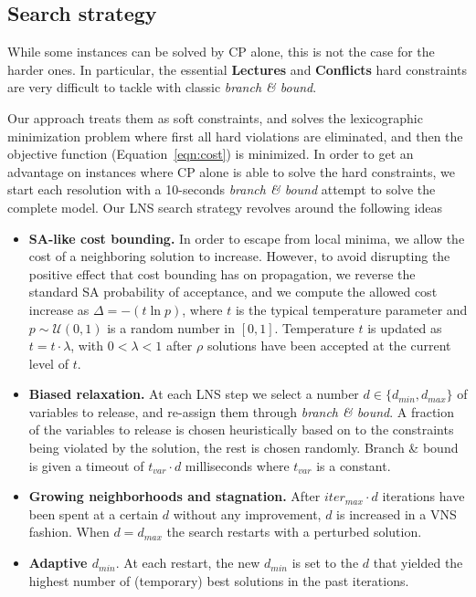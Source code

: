 \documentclass{llncs}
\begin{document}
\subsection{Search strategy}

While some instances can be solved by CP alone, this is not the case for the harder ones. In particular, the essential \textbf{Lectures} and \textbf{Conflicts} hard constraints are very difficult to tackle with classic \emph{branch \& bound}. 

Our approach treats them as soft constraints, and solves the lexicographic minimization problem where first all hard violations are eliminated, and then the objective function (Equation~\ref{eqn:cost}) is minimized. 
%
In order to get an advantage on instances where CP alone is able to solve the hard constraints, we start each resolution with a 10-seconds \emph{branch \& bound} attempt to solve the complete model.
%
\newpage
\noindent
Our LNS search strategy revolves around the following ideas

\begin{itemize}
    \item{\textbf{SA-like cost bounding.}} In order to escape from local minima, we allow the cost of a neighboring solution to increase. However, to avoid disrupting the positive effect that cost bounding has on propagation, we reverse the standard SA probability of acceptance, and we compute the allowed cost increase as $\Delta = -(t\ln p)$, where $t$ is the typical temperature parameter and $p \sim \mathcal{U}(0,1)$ is a random number in $[0,1]$. Temperature $t$ is updated as $t = t\cdot \lambda$, with $0 < \lambda < 1$ after $\rho$ solutions have been accepted at the current level of $t$.
    \item{\textbf{Biased relaxation.}} At each LNS step we select a number $d \in \{d_{min},d_{max}\}$ of variables to release, and re-assign them through \emph{branch \& bound}. A fraction of the variables to release is chosen heuristically based on to the constraints being violated by the solution, the rest is chosen randomly. Branch \& bound is given a timeout of $t_{var} \cdot d$ milliseconds where $t_{var}$ is a constant. 
    \item{\textbf{Growing neighborhoods and stagnation.}} After $iter_{max} \cdot d$ iterations have been spent at a certain $d$ without any improvement, $d$ is increased in a VNS fashion. When $d = d_{max}$ the search restarts with a perturbed solution.
    \item{\textbf{Adaptive $d_{min}$}.} At each restart, the new $d_{min}$ is set to the $d$ that yielded the highest number of (temporary) best solutions in the past iterations.
\end{itemize}
\end{document}
